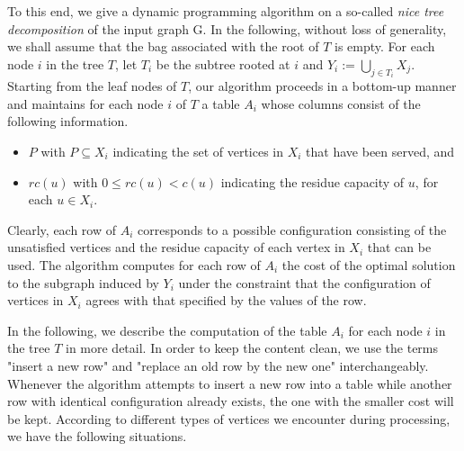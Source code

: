 \documentclass[a4paper,11pt]{article}
\theoremstyle{definition}
\begin{document}
\smallskip

To this end, we give a dynamic programming algorithm on a so-called {\em nice tree decomposition} \cite{DBLP:books/sp/Kloks94} of the input graph G. In the following, without loss of generality, we shall assume that the bag associated with the root of $T$ is empty. For each node $i$ in the tree $T$, let $T_i$ be the subtree rooted at $i$ and $Y_i := \bigcup_{j \in T_i}X_j$. Starting from the leaf nodes of $T$, our algorithm proceeds in a bottom-up manner and maintains for each node $i$ of $T$ a table $A_i$ whose columns consist of the following information.

\begin{itemize}
\item{$P$ with $P \subseteq X_i$ indicating the set of vertices in $X_i$ that have been served, and}
\item{$rc(u)$ with $0 \le rc(u) < c(u)$ indicating the residue capacity of $u$, for each $u \in X_i$.}
\end{itemize}

Clearly, each row of $A_i$ corresponds to a possible configuration consisting of the unsatisfied vertices and the residue capacity of each vertex in $X_i$ that can be used. The algorithm computes for each row of $A_i$ the cost of the optimal solution to the subgraph induced by $Y_i$ under the constraint that the configuration of vertices in $X_i$ agrees with that specified by the values of the row.

\smallskip

In the following, we describe the computation of the table $A_i$ for each node $i$ in the tree $T$ in more detail. In order to keep the content clean, we use the terms "insert a new row" and "replace an old row by the new one" interchangeably. Whenever the algorithm attempts to insert a new row into a table while another row with identical configuration already exists, the one with the smaller cost will be kept.  According to different types of vertices we encounter during processing, we have the following situations.
\end{document}
